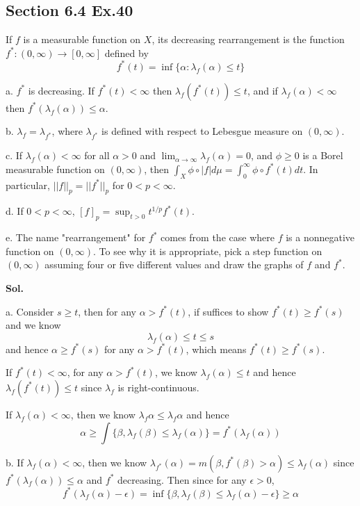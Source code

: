 \documentclass[lang=en,11pt,a4paper,citestyle =authoryear]{elegantpaper}
\begin{document}
\subsection*{Section 6.4 Ex.40} 
If $f$ is a measurable function on $X$, its decreasing rearrangement is the function $f^*:(0,\infty) \to [0,\infty]$ defined by
\[ f^*(t) = \inf\{\alpha:\lambda_f(\alpha) \leq t\}\]\par
a. $f^*$ is decreasing. If $f^*(t) < \infty$ then $\lambda_f(f^*(t)) \leq t$, and if $\lambda_f(\alpha) < \infty$ then $f^*(\lambda_f(\alpha)) \leq \alpha$.\par
b. $\lambda_f = \lambda_{f^*}$, where $\lambda_{f^*}$ is defined with respect to Lebesgue measure on $(0,\infty)$.\par
c. If $\lambda_f(\alpha) < \infty$ for all $\alpha > 0$ and $\lim_{\alpha \to \infty} \lambda_f(\alpha) = 0$, and $\phi\geq 0$ is a Borel measurable function on $(0,\infty)$, then $\int_X \phi \circ |f|d\mu = \int_0^{\infty} \phi\circ f^*(t)dt$. In particular, $||f||_p = ||f^*||_p$ for $0<p<\infty$.\par
d. If $0<p<\infty$, $[f]_p = \sup_{t>0} t^{1/p} f^*(t)$.\par
e. The name "rearrangement" for $f^*$ comes from the case where $f$ is a nonnegative function on $(0,\infty)$. To see why it is appropriate, pick a step function on $(0,\infty)$ assuming four or five different values and draw the graphs of $f$ and $f^*$.\par
\vspace{0.5em}
\textbf{Sol.} \par
a. Consider $s\geq t$, then for any $\alpha > f^*(t)$, if suffices to show $f^*(t) \geq f^*(s)$ and we know
\[ \lambda_f(\alpha) \leq t \leq s\]
and hence $\alpha \geq f^*(s)$ for any $\alpha > f^*(t)$, which means $f^*(t) \geq f^*(s)$.\par
If $f^*(t)<\infty$, for any $\alpha > f^*(t)$, we know $\lambda_f(\alpha) \leq t$ and hence $\lambda_f(f^*(t)) \leq t$ since $\lambda_f$ is right-continuous.\par
If $\lambda_f(\alpha) < \infty$, then we know $\lambda_f{\alpha} \leq \lambda_f{\alpha}$ and hence
\[\alpha \geq \int\{\beta, \lambda_f(\beta) \leq \lambda_f(\alpha)\} = f^*(\lambda_f(\alpha))\]\par
b. If $\lambda_f(\alpha) < \infty$, then we know $\lambda_{f^*}(\alpha) = m(\beta, f^*(\beta) > \alpha) \leq \lambda_f(\alpha)$ since $f^*(\lambda_f(\alpha)) \leq \alpha$ and $f^*$ decreasing. Then since for any $\epsilon > 0$,
\[
f^*(\lambda_{f}(\alpha)-\epsilon) = \inf\{\beta, \lambda_f(\beta) \leq \lambda_{f}(\alpha) - \epsilon\} \geq \alpha
\]
\end{document}
